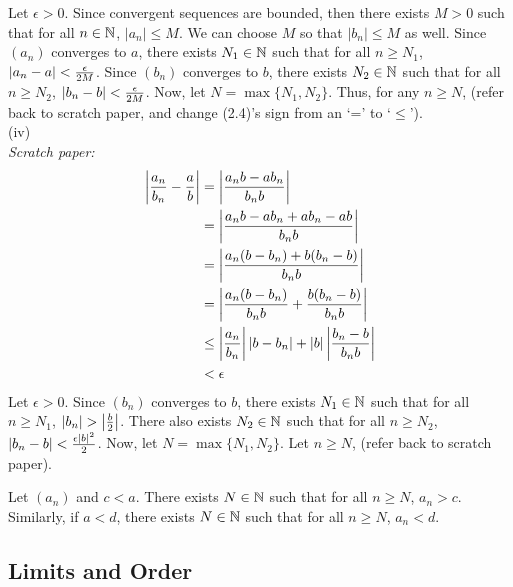 {Let \(\epsilon > 0\). Since convergent sequences are bounded, then there exists \(M > 0\) such that for all \(n \in \mathbb{N}\), \(|a_n| \leq M\). We can choose \(M\) so that \(|b_n| \leq M\) as well. Since \((a_n)\) converges to \(a\), there exists \(N_1 \in \mathbb{N}\) such that for all \(n \geq N_1\), \(\left|a_n - a\right| < \frac{\epsilon}{2M}\). Since \((b_n)\) converges to \(b\), there exists \(N_2 \in \mathbb{N}\) such that for all \(n \geq N_2\), \(\left|b_n - b\right| < \frac{\epsilon}{2M}\). Now, let \(N = \max\{N_1, N_2\}\). Thus, for any \(n \geq N\), (refer back to scratch paper, and change (2.4)'s sign from an `=' to `\(\leq\)'). \\

(iv) \\
\textit{Scratch paper:}
\begin{align*}
    \left|\frac{a_n}{b_n} - \frac{a}{b}\right| & = \left|\frac{a_nb - ab_n}{b_nb}\right|                                                     \\
                                           & = \left|\frac{a_nb - ab_n + ab_n - ab}{b_nb}\right|                                         \\
                                           & = \left|\frac{a_n(b - b_n) + b(b_n - b)}{b_nb}\right|                                       \\
                                           & = \left|\frac{a_n(b - b_n)}{b_nb} + \frac{b(b_n - b)}{b_nb}\right|                          \\
                                           & \leq \left|\frac{a_n}{b_n}\right|\left|b - b_n\right| + \left|b\right|\left|\frac{b_n - b}{b_nb}\right| \\
                                           & < \epsilon
\end{align*}
Let \(\epsilon > 0\). Since \((b_n)\) converges to \(b\), there exists \(N_1 \in \mathbb{N}\) such that for all \(n \geq N_1\), \(\left|b_n \right| > \left|\frac{b}{2}\right|\). There also exists \(N_2 \in \mathbb{N}\) such that for all \(n \geq N_2\), \(\left|b_n - b\right| < \frac{\epsilon|b|^{2}}{2}\). Now, let \(N = \max\{N_1, N_2\}\). Let \(n \geq N\), (refer back to scratch paper). \qedhere
}

\begin{lemma}
    Let \((a_n)\) and \(c < a\). There exists \(N \in \mathbb{N}\) such that for all \(n \geq N\), \(a_n > c\). Similarly, if \(a < d\), there exists \(N \in \mathbb{N}\) such that for all \(n \geq N\), \(a_n < d\).
\end{lemma}

\subsection{Limits and Order}


